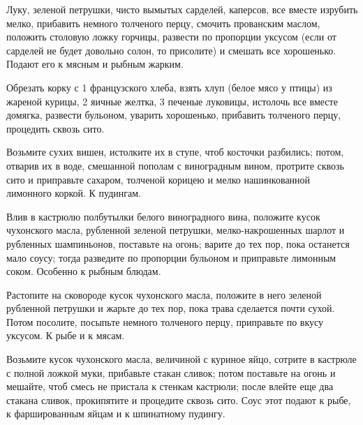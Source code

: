 
Луку, зеленой петрушки, чисто вымытых сарделей, каперсов, все вместе изрубить мелко, прибавить немного толченого перцу, смочить прованским маслом, положить столовую ложку горчицы, развести по пропорции уксусом (если от сарделей не будет довольно солон, то присолите) и смешать все хорошенько. Подают его к мясным и рыбным жарким. 


Обрезать корку с 1 французского хлеба, взять хлуп (белое мясо у птицы) из жареной курицы, 2 яичные желтка, 3 печеные луковицы, истолочь все вместе домягка, развести бульоном, уварить хорошенько, прибавить толченого перцу, процедить сквозь сито. 


Возьмите сухих вишен, истолките их в ступе, чтоб косточки разбились; потом, отварив их в воде, смешанной пополам с виноградным вином, протрите сквозь сито и приправьте сахаром, толченой корицею и мелко нашинкованной лимонного коркой. К пудингам. 


Влив в кастрюлю полбутылки белого виноградного вина, положите кусок чухонского масла, рубленной зеленой петрушки, мелко-накрошенных шарлот и рубленных шампиньонов, поставьте на огонь; варите до тех пор, пока останется мало соусу; тогда разведите по пропорции бульоном и приправьте лимонным соком. Особенно к рыбным блюдам. 


Растопите на сковороде кусок чухонского масла, положите в него зеленой рубленной петрушки и жарьте до тех пор, пока трава сделается почти сухой. Потом посолите, посыпьте немного толченого перцу, приправьте по вкусу уксусом. К рыбе и к мясам. 


Возьмите кусок чухонского масла, величиной с куриное яйцо, сотрите в кастрюле с полной ложкой муки, прибавьте стакан сливок; потом поставьте на огонь и мешайте, чтоб смесь не пристала к стенкам кастрюли; после влейте еще два стакана сливок, прокипятите и процедите сквозь сито. Соус этот подают к рыбе, к фаршированным яйцам и к шпинатному пудингу. 


